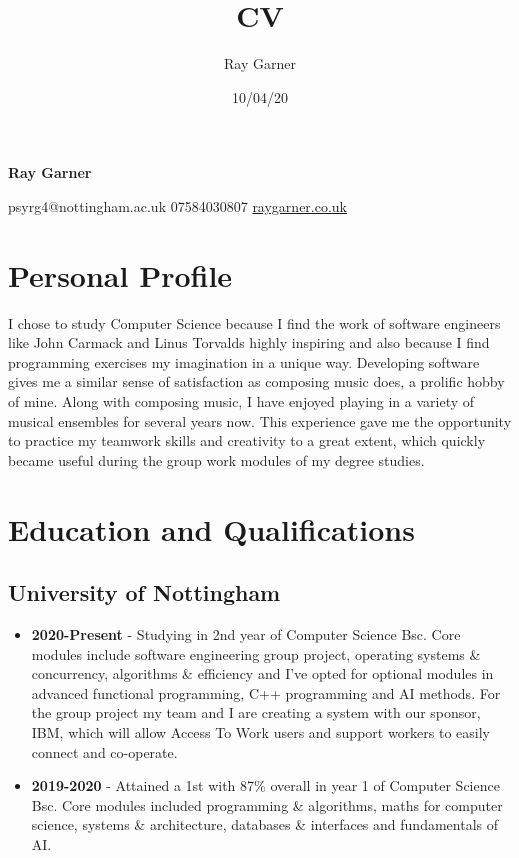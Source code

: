 \documentclass{article}
\title{CV}
\date{10/04/20}
\author{Ray Garner}
\makeatletter
\renewcommand{\maketitle}{
\begin{center}


{\huge\bfseries \vspace{-2cm} Ray Garner}
\vskip 0.25cm

{\large
psyrg4@nottingham.ac.uk\hspace{0.5cm}
07584030807\hspace{0.5cm}
\href{https://www.raygarner.co.uk}{raygarner.co.uk}}

\vskip 0.25cm

\end{center}
}
\makeatother
\begin{document}
\maketitle
\section{Personal Profile}
I chose to study Computer Science because I find the work of software engineers like John Carmack and Linus Torvalds highly inspiring and also because I find programming exercises my imagination in a unique way.
Developing software gives me a similar sense of satisfaction as composing music does, a prolific hobby of mine.
Along with composing music, I have enjoyed playing in a variety of musical ensembles for several years now. 
This experience gave me the opportunity to practice my teamwork skills and creativity to a great extent, which quickly became useful during the group work modules of my degree studies.


\section{Education and Qualifications}

\subsection{University of Nottingham}
\begin{itemize}[noitemsep]
\item \textbf{2020-Present} - Studying in 2nd year of Computer Science Bsc. Core modules include software engineering group project, operating systems \& concurrency, algorithms \& efficiency and I've opted for optional modules in advanced functional programming, C++ programming and AI methods. For the group project my team and I are creating a system with our sponsor, IBM, which will allow Access To Work users and support workers to easily connect and co-operate.

\item \textbf{2019-2020} - Attained a 1st with 87\% overall in year 1 of Computer Science Bsc. Core modules included programming \& algorithms, maths for computer science, systems \& architecture, databases \& interfaces and fundamentals of AI.


\end{itemize}
\end{document}
